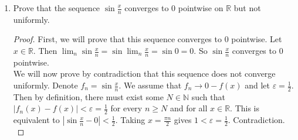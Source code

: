 \documentclass{article}
\begin{document}
\begin{enumerate}
        \item Prove that the sequence $\sin{\frac{x}{n}}$ converges to $0$ pointwise on $\mathbb{R}$ but not uniformly.
        \begin{proof}
            First, we will prove that this sequence converges to 0 pointwise. Let $x \in \mathbb{R}$. Then $\lim_n \sin{\frac{x}{n}} = \sin{\lim_n \frac{x}{n}} = \sin{0} = 0$. So $\sin{\frac{x}{n}}$ converges to 0 pointwise.\\
            We will now prove by contradiction that this sequence does not converge uniformly. Denote $f_n = \sin{\frac{x}{n}}$. We assume that $f_n \to 0-f(x)$ and let $\varepsilon = \frac{1}{2}$. Then by definition, there must exist some $N \in \mathbb{N}$ such that $|f_n(x)-f(x)| < \varepsilon = \frac{1}{2}$ for every $n \geq N$ and for all $x \in \mathbb{R}$. This is equivalent to $|\sin{\frac{x}{n} - 0}| < \frac{1}{2}$. Taking $x=\frac{\pi n}{2}$ gives $1 < \varepsilon = \frac{1}{2}$. Contradiction.\\
        \end{proof}
    \end{enumerate}
\end{document}
